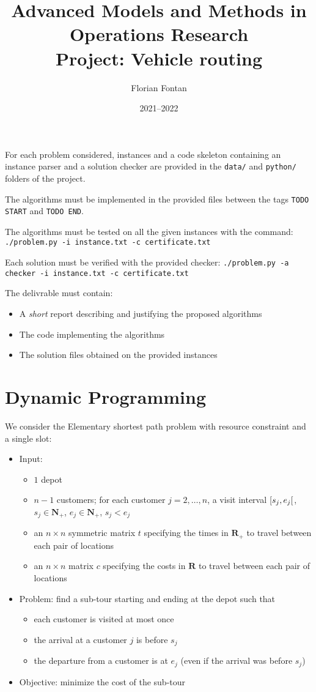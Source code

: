 \documentclass[a4paper]{article}
\author{Florian Fontan}
\title{Advanced Models and Methods in Operations Research \\ Project: Vehicle routing}
\date{2021--2022}
\newcommand{\N}{\mathbf{N}}
\newcommand{\R}{\mathbf{R}}
\begin{document}
\maketitle

For each problem considered, instances and a code skeleton containing an instance parser and a solution checker are provided in the \texttt{data/} and \texttt{python/} folders of the project.

The algorithms must be implemented in the provided files between the tags \texttt{TODO START} and \texttt{TODO END}.

The algorithms must be tested on all the given instances with the command: \texttt{./problem.py -i instance.txt -c certificate.txt}

Each solution must be verified with the provided checker: \texttt{./problem.py -a checker -i instance.txt -c certificate.txt}

\bigskip

The delivrable must contain:
\begin{itemize}
  \item A \emph{short} report describing and justifying the proposed algorithms
  \item The code implementing the algorithms
  \item The solution files obtained on the provided instances
\end{itemize}

\section{Dynamic Programming}

We consider the Elementary shortest path problem with resource constraint and a single slot:
\begin{itemize}
  \item Input:
    \begin{itemize}
      \item $1$ depot
      \item $n - 1$ customers; for each customer $j = 2, \dots, n$, a visit interval $\interval[open right]{s_j}{e_j}$, $s_j \in \N_+$, $e_j \in \N_+$, $s_j < e_j$
      \item an $n \times n$ symmetric matrix $t$ specifying the times in $\R_+$ to travel between each pair of locations
      \item an $n \times n$ matrix $c$ specifying the costs in $\R$ to travel between each pair of locations
    \end{itemize}
  \item Problem: find a sub-tour starting and ending at the depot such that
    \begin{itemize}
      \item each customer is visited at most once
      \item the arrival at a customer $j$ is before $s_j$
      \item the departure from a customer is at $e_j$ (even if the arrival was before $s_j$)
    \end{itemize}
  \item Objective: minimize the cost of the sub-tour
\end{itemize}
\end{document}
